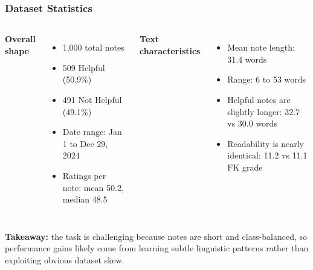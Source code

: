 \documentclass[11pt]{beamer}
\begin{document}
	\begin{frame}
		\frametitle{Dataset Statistics}
		\begin{columns}[T]
			\textbf{Overall shape}
			\begin{itemize}
				\item 1,000 total notes
				\item 509 Helpful (50.9\%)
				\item 491 Not Helpful (49.1\%)
				\item Date range: Jan 1 to Dec 29, 2024
				\item Ratings per note: mean 50.2, median 48.5
			\end{itemize}
			
			\textbf{Text characteristics}
			\begin{itemize}
				\item Mean note length: 31.4 words
				\item Range: 6 to 53 words
				\item Helpful notes are slightly longer: 32.7 vs 30.0 words
				\item Readability is nearly identical: 11.2 vs 11.1 FK grade
			\end{itemize}
		\end{columns}
		
		\vspace{0.3cm}
		\textbf{Takeaway:} the task is challenging because notes are short and class-balanced, so performance gains likely come from learning subtle linguistic patterns rather than exploiting obvious dataset skew.
	\end{frame}
	
\end{document}
